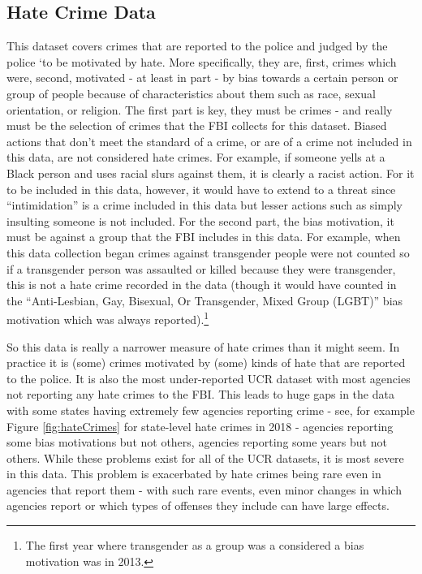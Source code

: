 \documentclass[
  12pt,
  openany]{book}
\begin{document}
\hypertarget{hate-crime-data}{%
\subsection{Hate Crime Data}\label{hate-crime-data}}

This dataset covers crimes that are reported to the police and judged by the police `to be motivated by hate. More specifically, they are, first, crimes which were, second, motivated - at least in part - by bias towards a certain person or group of people because of characteristics about them such as race, sexual orientation, or religion. The first part is key, they must be crimes - and really must be the selection of crimes that the FBI collects for this dataset. Biased actions that don't meet the standard of a crime, or are of a crime not included in this data, are not considered hate crimes. For example, if someone yells at a Black person and uses racial slurs against them, it is clearly a racist action. For it to be included in this data, however, it would have to extend to a threat since ``intimidation'' is a crime included in this data but lesser actions such as simply insulting someone is not included. For the second part, the bias motivation, it must be against a group that the FBI includes in this data. For example, when this data collection began crimes against transgender people were not counted so if a transgender person was assaulted or killed because they were transgender, this is not a hate crime recorded in the data (though it would have counted in the ``Anti-Lesbian, Gay, Bisexual, Or Transgender, Mixed Group (LGBT)'' bias motivation which was always reported).\footnote{The first year where transgender as a group was a considered a bias motivation was in 2013.}

So this data is really a narrower measure of hate crimes than it might seem. In practice it is (some) crimes motivated by (some) kinds of hate that are reported to the police. It is also the most under-reported UCR dataset with most agencies not reporting any hate crimes to the FBI. This leads to huge gaps in the data with some states having extremely few agencies reporting crime - see, for example Figure \ref{fig:hateCrimes} for state-level hate crimes in 2018 - agencies reporting some bias motivations but not others, agencies reporting some years but not others. While these problems exist for all of the UCR datasets, it is most severe in this data. This problem is exacerbated by hate crimes being rare even in agencies that report them - with such rare events, even minor changes in which agencies report or which types of offenses they include can have large effects.
\end{document}
